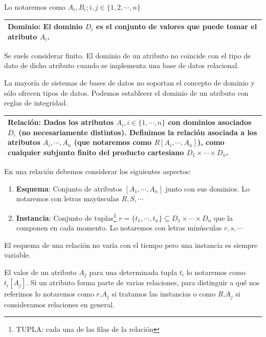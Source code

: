 \documentclass[10pt,a4paper,spanish]{report}
\begin{document}
Lo notaremos como $A_i, B_i ; i, j \in \{1,2, \cdots, n\}$

\begin{center}
\begin{tabular}{|p{12cm}|}
\hline
\textcolor[rgb]{1,0.2,0.3}{\textbf{Dominio}}: El dominio $D_i$ es el conjunto de valores que puede tomar el atributo $A_i$. \\
\hline
\end{tabular}
\end{center}

Se suele considerar finito. El dominio de un atributo no coincide con el tipo de dato de dicho atributo cuando se implementa una base de datos relacional.

La mayoría de sistemas de bases de datos no soportan el concepto de dominio y sólo ofrecen tipos de datos. Podemos establecer el dominio de un atributo con reglas de integridad.

\begin{center}
\begin{tabular}{|p{12cm}|}
\hline
\textcolor[rgb]{1,0.2,0.3}{\textbf{Relación}}: Dados los atributos $A_i, i \in \{1, \cdots, n\}$ con dominios asociados $D_i$ (no necesariamente distintos). Definimos la relación asociada a los atributos $A_i, \cdots, A_n$ (que notaremos como $R[A_i, \cdots, A_n]$), como cualquier subjunto finito del producto cartesiano $D_1 \times \cdots \times D_n$. \\
\hline
\end{tabular}
\end{center}

En una relación debemos considerar los siguientes aspectos:
\begin{enumerate}[$\heartsuit$]
    \item \textcolor[rgb]{1,0.2,0.3}{\textbf{Esquema}}: Conjunto de atributos $[A_1, \cdots , A_n]$ junto con sus dominios. Lo notaremos con letras mayúsculas $R, S, \cdots$
    \item \textcolor[rgb]{1,0.2,0.3}{\textbf{Instancia}}: Conjunto de tuplas\footnote{TUPLA: cada una de las filas de la relación} $r = \{t_1, \cdots, t_n\} \subseteq D_1 \times \cdots \times D_n$ que la componen en cada momento. Lo notaremos con letras minúsculas $r, s, \cdots$
\end{enumerate}

El esquema de una relación no varía con el tiempo pero una instancia es siempre variable.

El valor de un atributo $A_j$ para una determinada tupla $t_i$ lo notaremos como $t_i [A_j]$. Si un atributo forma parte de varias relaciones, para distinguir a qué nos referimos lo notaremos como $r.A_j$ si tratamos las instancias o como $R.A_j$ si consideramos relaciones en general.
\end{document}
